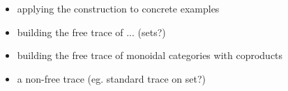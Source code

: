 \begin{itemize}
	\item applying the construction to concrete examples
	\item building the free trace of ... (sets?)
	\item building the free trace of monoidal categories with coproducts
	\item a non-free trace (eg. standard trace on set?)
\end{itemize}

